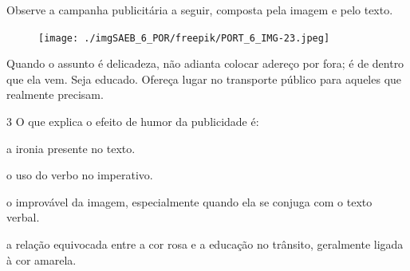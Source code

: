 
Observe a campanha publicitária a seguir, composta pela imagem e
pelo texto.

\begin{myquote}
\begin{figure}[H]
\centering\texttt{[image: ./imgSAEB\_6\_POR/freepik/PORT\_6\_IMG-23.jpeg]}
\end{figure}

Quando o assunto é delicadeza, não adianta colocar adereço por fora; é
de dentro que ela vem. Seja educado. Ofereça lugar no transporte público
para aqueles que realmente precisam. 
\end{myquote}

\num{3} O que explica o efeito de humor da publicidade é:

\begin{escolha}
\item a ironia presente no texto.
\item o uso do verbo no imperativo.
\item o improvável da imagem, especialmente quando ela se conjuga com o
texto verbal. \item a relação equivocada entre a cor rosa e a educação no trânsito,
geralmente ligada à cor amarela.
\end{escolha}


